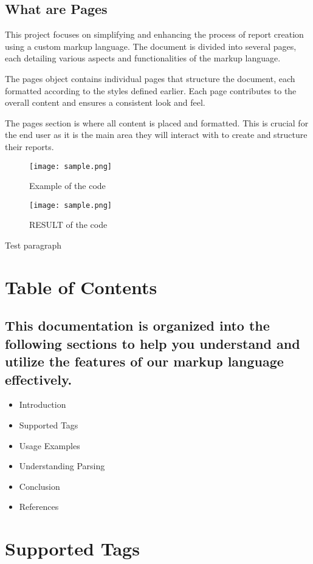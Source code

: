 \documentclass[oneside]{book}
\begin{document}
\section{What are Pages}
This project focuses on simplifying and enhancing the process of report creation using a custom markup language. The document is divided into several 
            pages, each detailing various aspects and functionalities of the markup language. \par
The pages object contains individual pages that structure the document, each formatted according to the styles defined earlier. Each page contributes 
            to the overall content and ensures a consistent look and feel.\par
The pages section is where all content is placed and formatted. This is crucial for the end user as it is the main area they will interact with to create 
            and structure their reports.\par
\begin{figure}[h]
\centering
\texttt{[image: sample.png]}
\caption{Example of the code}
\end{figure}\begin{figure}[h]
\centering
\texttt{[image: sample.png]}
\caption{RESULT of the code}
\end{figure}Test paragraph\par

\newpage
\chapter{Table of Contents}
\section{This documentation is organized into the following sections to help you understand and utilize the features of our markup language effectively.}
\begin{itemize}
\item Introduction
\item Supported Tags
\item Usage Examples
\item Understanding Parsing
\item Conclusion
\item References
\end{itemize}

\newpage
\chapter{Supported Tags}
\end{document}
